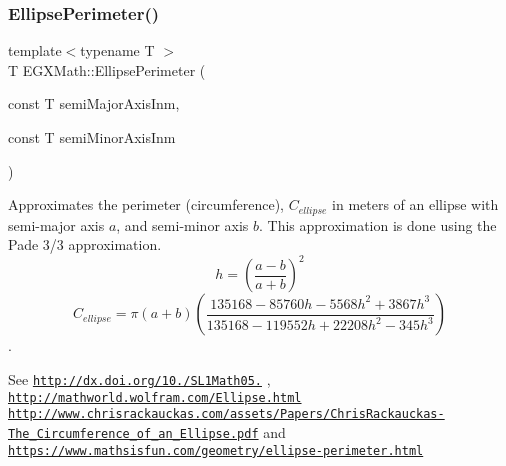 \subsubsection{\texorpdfstring{Ellipse\+Perimeter()}{EllipsePerimeter()}}
{\footnotesize\ttfamily template$<$typename T $>$ \\
T E\+G\+X\+Math\+::\+Ellipse\+Perimeter (\begin{DoxyParamCaption}\item[{const T}]{semi\+Major\+Axis\+Inm,  }\item[{const T}]{semi\+Minor\+Axis\+Inm }\end{DoxyParamCaption})}



Approximates the perimeter (circumference), $C_{ellipse}$ in meters of an ellipse with semi-\/major axis $a$, and semi-\/minor axis $b$. This approximation is done using the Pade 3/3 approximation. \[ h=\left( \frac{a-b}{a+b} \right)^2 \] \[ C_{ellipse}=\pi (a + b) \left( \frac{135168-85760 h-5568 h^2+ 3867 h^3}{135168-119552 h+ 22208 h^2 - 345h^3} \right) \]. 

See \href{http://dx.doi.org/10.3247/SL1Math05.004}{\tt http\+://dx.\+doi.\+org/10./\+S\+L1\+Math05.} , \href{http://mathworld.wolfram.com/Ellipse.html}{\tt http\+://mathworld.\+wolfram.\+com/\+Ellipse.\+html} \href{http://www.chrisrackauckas.com/assets/Papers/ChrisRackauckas-The_Circumference_of_an_Ellipse.pdf}{\tt http\+://www.\+chrisrackauckas.\+com/assets/\+Papers/\+Chris\+Rackauckas-\/\+The\+\_\+\+Circumference\+\_\+of\+\_\+an\+\_\+\+Ellipse.\+pdf} and \href{https://www.mathsisfun.com/geometry/ellipse-perimeter.html}{\tt https\+://www.\+mathsisfun.\+com/geometry/ellipse-\/perimeter.\+html}

